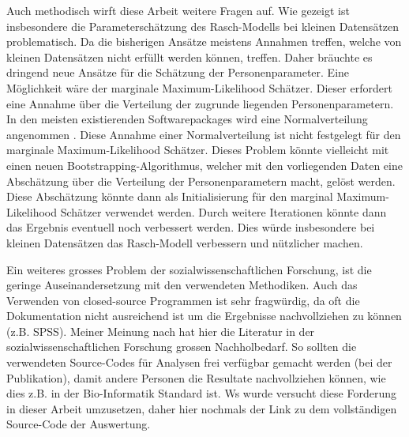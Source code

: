 Auch methodisch wirft diese Arbeit weitere Fragen auf. Wie gezeigt ist insbesondere die Parameterschätzung des Rasch-Modells bei kleinen Datensätzen problematisch. Da die bisherigen Ansätze meistens Annahmen treffen, welche von kleinen Datensätzen nicht erfüllt werden können, treffen. Daher bräuchte es dringend neue Ansätze für die Schätzung der Personenparameter. Eine Möglichkeit wäre der marginale Maximum-Likelihood Schätzer. Dieser erfordert eine Annahme über die Verteilung der zugrunde liegenden Personenparametern. In den meisten existierenden Softwarepackages wird eine Normalverteilung angenommen \citep{Rost2004, Rizopoulos2006}. Diese Annahme einer Normalverteilung ist nicht festgelegt für den marginale Maximum-Likelihood Schätzer. Dieses Problem könnte vielleicht mit einen neuen Bootstrapping-Algorithmus, welcher mit den vorliegenden Daten eine Abschätzung über die Verteilung der Personenparametern macht, gelöst werden. Diese Abschätzung könnte dann als Initialisierung für den marginal Maximum-Likelihood Schätzer verwendet werden. Durch weitere Iterationen könnte dann das Ergebnis eventuell noch verbessert werden. Dies würde insbesondere bei kleinen Datensätzen das Rasch-Modell verbessern und nützlicher machen.

Ein weiteres grosses Problem der sozialwissenschaftlichen Forschung, ist die geringe Auseinandersetzung mit den verwendeten Methodiken. Auch das Verwenden von closed-source Programmen ist sehr fragwürdig, da oft die Dokumentation nicht ausreichend ist um die Ergebnisse nachvollziehen zu können (z.B. SPSS).  Meiner Meinung nach hat hier die Literatur in der sozialwissenschaftlichen Forschung grossen Nachholbedarf. So sollten die verwendeten Source-Codes für Analysen frei verfügbar gemacht werden (bei der Publikation), damit andere Personen die Resultate nachvollziehen können, wie dies z.B. in der Bio-Informatik Standard ist. Ws wurde versucht diese Forderung in dieser Arbeit umzusetzen, daher hier nochmals der Link zu dem vollständigen Source-Code der Auswertung.

